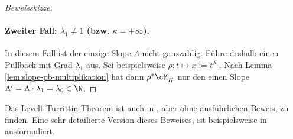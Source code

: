 \begin{proof}[Beweisskizze]
\paragraph{Zweiter Fall: $\lambda_1\neq1$ (bzw. $\kappa = +\infty$).} 
In diesem Fall ist der einzige Slope $\Lambda$ nicht ganzzahlig. Führe deshalb
einen Pullback mit Grad $\lambda_1$ aus.
Sei beispielsweise $\rho:t\mapsto x:=t^{\lambda_1}$.
Nach Lemma \ref{lem:slope-pb-multiplikation} hat dann $\rho^*\cM_{\hat K}$ nur
den einen Slope $\Lambda'=\Lambda\cdot\lambda_1=\lambda_0\in\N$.
\begin{comment}
Damit können wir nun die zugehörige Linearform $\ell':=\lambda_0s_0+s_1$
definieren. Es gilt dass
\[
\sigma_{\ell'}(P')=\dots
\]
ist, welches zumindest zwei unterschiedliche Nullstellen hat. Nun wendet man
den zweiten Unterfall des ersten Fall an.
\end{comment}
\end{proof} %
\begin{bem}
Das Levelt-Turrittin-Theorem ist auch in \cite[Thm 5.4.7]{sabbah_cimpa90}, aber
ohne ausführlichen Beweis, zu finden.
Eine sehr detailierte Version dieses Beweises, ist beispielsweise in \cite[Thm
5.16]{DiplHedwig} ausformuliert.
\end{bem}

\begin{comment}
\begin{prop}
\cite[Prop 3.1]{sabbah_Fourier-local}
Jeder irreduzible endlich dimensionale formale meromorphe Zusammenhang
$\cM_{\hat L}$ ist isomorph zu $\rho_+(\sE^\phi\otimes_{\hat K} S)$, wobei
$\phi\in x^{-1}\C[x^-1]$, $\rho:x\mapsto t=x^p$ mit grad $p\geq1$ minimal bzgl.
$\phi$ (siehe \cite[Rem 2.8]{sabbah_Fourier-local}), und $S$ ist ein Rang $1$
$\hat K$-Vektor Raum mit regulärem Zusammenhang.
\end{prop}
\begin{proof}
\cite[Prop 3.1]{sabbah_Fourier-local}
\end{proof}

\begin{thm}[Refined Turrittin-Levelt]
\cite[Cor 3.3]{sabbah_Fourier-local}
Jeder endlich dimensionale meromorphe Zusammenhang $\cM_{\hat K}$ kann in
eindutiger weiße geschrieben werden als direkte Summe $\bigoplus
El(\rho,\phi,R)\bydef\bigoplus\rho_+(\sE^\phi)\otimes R$, so dass
jedes $\rho_+\sE^\phi$ irreduzibel ist und keine zwei $\rho_+\sE^\phi$ isomorph
sind.
\end{thm}
\begin{proof}
\cite[Cor 3.3]{sabbah_Fourier-local}
\end{proof}
\end{comment}


